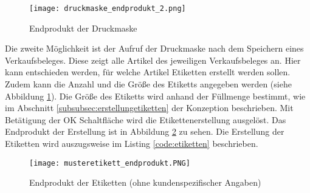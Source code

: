 \begin{figure}[H]
    \centering
    \texttt{[image: druckmaske\_endprodukt\_2.png]}
    \caption[Endprodukt der Druckmaske]
    {\small{Endprodukt der Druckmaske}}
    \label{fig:epdruckmaske}
\end{figure}

\noindent
Die zweite Möglichkeit ist der Aufruf der Druckmaske nach dem Speichern eines Verkaufsbeleges. 
Diese zeigt alle Artikel des jeweiligen Verkaufsbeleges an. Hier kann entschieden werden, für 
welche Artikel Etiketten erstellt werden sollen. Zudem kann die Anzahl und die Größe des
Etiketts angegeben werden (siehe Abbildung \ref{fig:epdruckmaske}). Die Größe des Etiketts wird 
anhand der Füllmenge bestimmt, wie im Abschnitt \ref{subsubsec:erstellungetiketten} der Konzeption beschrieben. 
Mit Betätigung der OK Schaltfläche wird die Etikettenerstellung ausgelöst. Das Endprodukt der 
Erstellung ist in Abbildung \ref{fig:epetikett} zu sehen. Die Erstellung der Etiketten wird auszugsweise 
im Listing \ref{code:etiketten} beschrieben.

\begin{figure}[H]
    \centering
    \texttt{[image: musteretikett\_endprodukt.PNG]}
    \caption[Endprodukt der Etiketten]
    {\small{Endprodukt der Etiketten (ohne kundenspezifischer Angaben)}}
    \label{fig:epetikett}
\end{figure}

